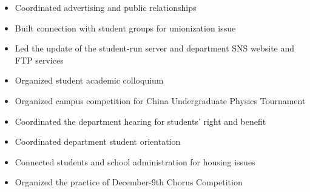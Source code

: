 \documentclass[localFont,alternative]{yaac-another-awesome-cv}
\begin{document}

\begin{minipage}{\linewidth}
\begin{itemize}[leftmargin=2em]
	\item Coordinated advertising and public relationships
	\item Built connection with student groups for unionization issue
\end{itemize}
\end{minipage}
\begin{minipage}{\linewidth}
\begin{itemize}[leftmargin=2em]
	\item Led the update of the student-run server and department SNS 
	website and FTP services
	\item Organized student academic colloquium
	\item Organized campus competition for China Undergraduate Physics Tournament
\end{itemize}
\end{minipage}
\begin{minipage}{\linewidth}
\begin{itemize}[leftmargin=2em]
	\item Coordinated the department hearing for students' right and benefit
	\item Coordinated department student orientation
	\item Connected students and school administration for housing issues
	\item Organized the practice of December-9th Chorus Competition
\end{itemize}
\end{minipage}
\end{document}
